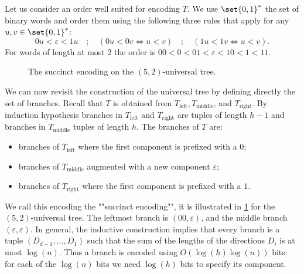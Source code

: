 Let us consider an order well suited for encoding $T$.
We use $\set{0,1}^*$ the set of binary words and order them using the following three rules that apply for any $u,v \in \set{0,1}^*$:
\[
0u < \varepsilon < 1u \quad ; \quad (0u < 0v \Longleftrightarrow u < v) \quad ; \quad (1u < 1v \Longleftrightarrow u < v).
\]
For words of length at most $2$ the order is $00 < 0 < 01 < \varepsilon < 10 < 1 < 11$.

\begin{figure}[!ht]
\centering
{}
\caption{The succinct encoding on the $(5,2)$-universal tree.}
\label{3-fig:tree_encoded}
\end{figure}

We can now revisit the construction of the universal tree by defining directly the set of branches.
Recall that $T$ is obtained from $T_\text{left},T_\text{middle}$, and $T_\text{right}$. 
By induction hypothesis branches in $T_\text{left}$ and $T_\text{right}$ are tuples of length $h-1$
and branches in $T_\text{middle}$ tuples of length $h$.
The branches of $T$ are:
\begin{itemize}
	\item branches of $T_\text{left}$ where the first component is prefixed with a $0$;
	\item branches of $T_\text{middle}$ augmented with a new component $\varepsilon$;
	\item branches of $T_\text{right}$ where the first component is prefixed with a $1$.
\end{itemize}
We call this encoding the ""succinct encoding"", it is illustrated in \cref{3-fig:tree_encoded} for the $(5,2)$-universal tree.
The leftmost branch is $(00,\varepsilon)$, and the middle branch $(\varepsilon,\varepsilon)$.
In general, the inductive construction implies that every branch is a tuple $(D_{d-1},\dots,D_1)$ 
such that the sum of the lengths of the directions $D_i$ is at most $\log(n)$.
Thus a branch is encoded using $O(\log(h) \log(n))$ bits: for each of the $\log(n)$ bits we need $\log(h)$ bits to specify its component.

